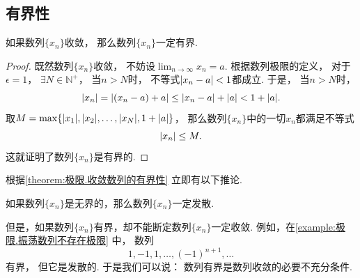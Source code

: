 \subsection{有界性}
\begin{theorem}[有界性]\label{theorem:极限.收敛数列的有界性}
如果数列\(\{x_n\}\)收敛，
那么数列\(\{x_n\}\)一定有界.
\begin{proof}
既然数列\(\{x_n\}\)收敛，
不妨设\(\lim_{n\to\infty} x_n = a\).
根据数列极限的定义，
对于\(\epsilon = 1\)，
\(\exists N \in \mathbb{N}^+\)，
当\(n > N\)时，
不等式\(\abs{x_n - a} < 1\)都成立.
于是，
当\(n > N\)时，
\begin{equation*}
	\abs{x_n} = \abs{(x_n - a) + a} \leq \abs{x_n - a} + \abs{a} < 1 + \abs{a}.
\end{equation*}
取\(M = \max\{\abs{x_1},\abs{x_2},\dotsc,\abs{x_N},1+\abs{a}\}\)，
那么数列\(\{x_n\}\)中的一切\(x_n\)都满足不等式\begin{equation*}
	\abs{x_n} \leq M.
\end{equation*}
这就证明了数列\(\{x_n\}\)是有界的.
\end{proof}
\end{theorem}

根据\cref{theorem:极限.收敛数列的有界性} 立即有以下推论.
\begin{corollary}
如果数列\(\{x_n\}\)是无界的，那么数列\(\{x_n\}\)一定发散.
\end{corollary}
但是，如果数列\(\{x_n\}\)有界，却不能断定数列\(\{x_n\}\)一定收敛.
例如，在\cref{example:极限.振荡数列不存在极限} 中，
数列\begin{equation*}
	1,-1,1,\dotsc,(-1)^{n+1},\dotsc
\end{equation*}有界，
但它是发散的.
于是我们可以说：
数列有界是数列收敛的必要不充分条件.

